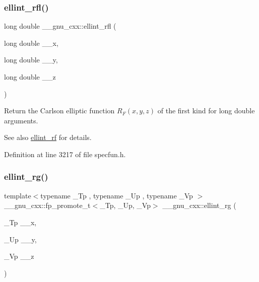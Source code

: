 \mbox{\label{group__gnu__math__spec__func_ga38dd36b3db5bbe5da516d0cbe3ff1f21}} 
\subsubsection{\texorpdfstring{ellint\+\_\+rfl()}{ellint\_rfl()}}
{\footnotesize\ttfamily long double \+\_\+\+\_\+gnu\+\_\+cxx\+::ellint\+\_\+rfl (\begin{DoxyParamCaption}\item[{long double}]{\+\_\+\+\_\+x,  }\item[{long double}]{\+\_\+\+\_\+y,  }\item[{long double}]{\+\_\+\+\_\+z }\end{DoxyParamCaption})\hspace{0.3cm}{\ttfamily [inline]}}

Return the Carlson elliptic function $ R_F(x,y,z) $ of the first kind for {\ttfamily long double} arguments.

\begin{DoxySeeAlso}{See also}
\hyperlink{group__gnu__math__spec__func_gae4859494464c7eaf98193f92b2235bc1}{ellint\+\_\+rf} for details. 
\end{DoxySeeAlso}


Definition at line 3217 of file specfun.\+h.

\mbox{\label{group__gnu__math__spec__func_gadf618529d6106c1c1bc1e9212c4fed12}} 
\subsubsection{\texorpdfstring{ellint\+\_\+rg()}{ellint\_rg()}}
{\footnotesize\ttfamily template$<$typename \+\_\+\+Tp , typename \+\_\+\+Up , typename \+\_\+\+Vp $>$ \\
\+\_\+\+\_\+gnu\+\_\+cxx\+::fp\+\_\+promote\+\_\+t$<$\+\_\+\+Tp, \+\_\+\+Up, \+\_\+\+Vp$>$ \+\_\+\+\_\+gnu\+\_\+cxx\+::ellint\+\_\+rg (\begin{DoxyParamCaption}\item[{\+\_\+\+Tp}]{\+\_\+\+\_\+x,  }\item[{\+\_\+\+Up}]{\+\_\+\+\_\+y,  }\item[{\+\_\+\+Vp}]{\+\_\+\+\_\+z }\end{DoxyParamCaption})\hspace{0.3cm}{\ttfamily [inline]}}

